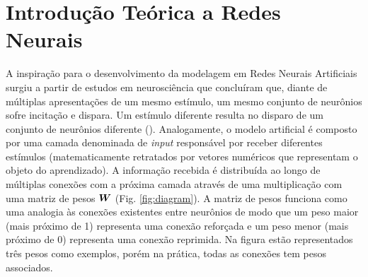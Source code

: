 \section{Introdução Teórica a Redes Neurais}
\label{sec:intro-rn}
A inspiração para o desenvolvimento da modelagem em Redes Neurais Artificiais surgiu a partir de estudos em neurosciência que concluíram que, diante de múltiplas apresentações de um mesmo estímulo, um mesmo conjunto de neurônios sofre incitação e dispara. Um estímulo diferente resulta no disparo de um conjunto de neurônios diferente (\cite{hubel:1962}). Analogamente, o modelo artificial é composto por uma camada denominada de \textit{input} responsável por receber diferentes estímulos (matematicamente retratados por vetores numéricos que representam o objeto do aprendizado). A informação recebida é distribuída ao longo de múltiplas conexões com a próxima camada através de uma multiplicação com uma matriz de pesos $\bm{W}$ (Fig. \ref{fig:diagram}). A matriz de pesos funciona como uma analogia às conexões existentes entre neurônios de modo que um peso maior (mais próximo de 1) representa uma conexão reforçada e um peso menor (mais próximo de 0) representa uma conexão reprimida. Na figura estão representados três pesos como exemplos, porém na prática, todas as conexões tem pesos associados.



